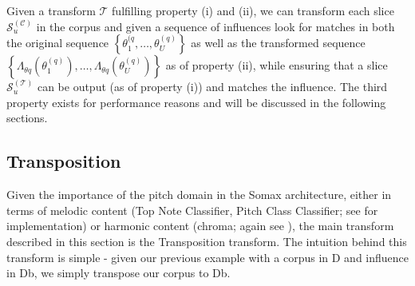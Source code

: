 \noindent Given a transform $\mathcal T$ fulfilling property (i) and (ii), we can transform each slice $\mathcal S^{(\mathcal C)}_u$ in the corpus and given a sequence of influences look for matches in both the original sequence $\left\lbrace \theta^{(q}_1, \dots, \theta^{(q)}_U\right\rbrace$ as well as the transformed sequence $\left\lbrace \Lambda_{\theta q} \left(\theta^{(q)}_1 \right), \dots, \Lambda_{\theta q} \left(\theta^{(q)}_U \right)\right\rbrace$ as of property (ii), while ensuring that a slice $\mathcal S^{(\mathcal T)}_u$ can be output (as of property (i)) and matches the influence. 
	The third property exists for performance reasons and will be discussed in the following sections.

\subsection{Transposition}\label{ssec:transposition}
Given the importance of the pitch domain in the Somax architecture, either in terms of melodic content (Top Note Classifier, Pitch Class Classifier; see \cite{somaxsoftware2021} for implementation) or harmonic content (chroma; again see \cite{somaxsoftware2021}), the main transform described in this section is the Transposition transform. The intuition behind this transform is simple - given our previous example with a corpus in D and influence in Db, we simply transpose our corpus to Db. 

